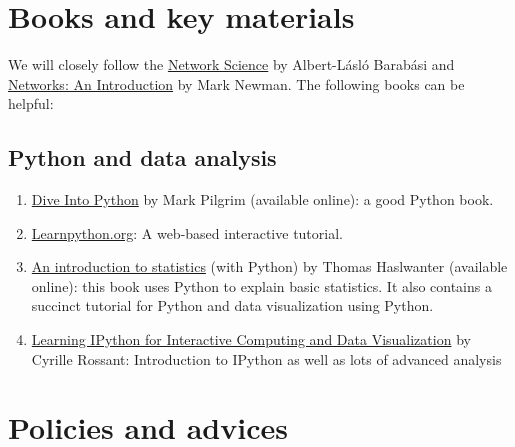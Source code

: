 \documentclass[11pt,article,oneside]{memoir} %
\begin{document}
\section{Books and key materials} %

We will closely follow the
\href{http://barabasi.com/networksciencebook/}{Network Science} by Albert-Lásló
Barabási and
\href{https://www.amazon.com/Networks-Introduction-Mark-Newman/dp/0199206651}{Networks:
An Introduction} by Mark Newman. The following books can be helpful:

\subsection{Python and data analysis} %

\begin{enumerate}

\item \href{http://www.diveintopython3.net/index.html}{Dive Into Python} by Mark Pilgrim (available online): a good Python book. 

\item \href{http://www.learnpython.org}{Learnpython.org}: A web-based interactive tutorial. 

\item \href{http://work.thaslwanter.at/Stats/html/}{An introduction to statistics} (with Python) by Thomas Haslwanter (available online): this book uses Python to explain basic statistics. It also contains a succinct tutorial for Python and data visualization using Python. 

\item \href{http://ipython.rossant.net}{Learning IPython for Interactive Computing and Data Visualization} by  Cyrille Rossant: Introduction to IPython as well as lots of advanced analysis 


\end{enumerate} %
\section{Policies and advices} %
\end{document}
